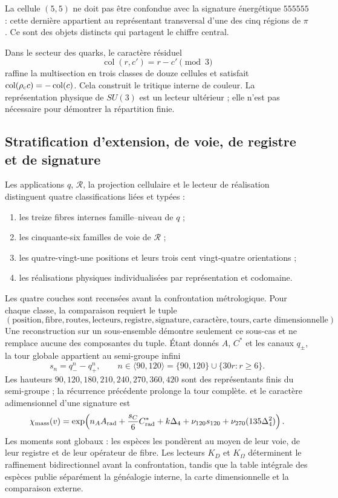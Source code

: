 La cellule \((5,5)\) ne doit pas être confondue avec la signature énergétique
\(555555\) : cette dernière appartient au représentant transversal d'une des
cinq régions de \(\pi\). Ce sont des objets distincts qui partagent le chiffre
central.

Dans le secteur des quarks, le caractère résiduel
\[
 \operatorname{col}(r,c')=r-c'\pmod3
\]
raffine la multisection en trois classes de douze cellules et satisfait
\(\operatorname{col}(\rho_{\rm c} c)=-\operatorname{col}(c)\). Cela construit le
tritique interne de couleur. La représentation physique de \(SU(3)\) est un
lecteur ultérieur ; elle n'est pas nécessaire pour démontrer la répartition finie.

\subsection{Stratification d'extension, de voie, de registre et de signature}

Les applications \(q\), \(\mathcal R\), la projection cellulaire et le lecteur de
réalisation distinguent quatre classifications liées et typées :
\begin{enumerate}[label=(\roman*)]
 \item les treize fibres internes famille--niveau de \(q\) ;
 \item les cinquante-six familles de voie de \(\mathcal R\) ;
 \item les quatre-vingt-une positions et leurs trois cent vingt-quatre
       orientations ;
 \item les réalisations physiques individualisées par représentation et codomaine.
\end{enumerate}
Les quatre couches sont recensées avant la confrontation métrologique. Pour chaque classe,
la comparaison requiert le tuple
\[
(\text{position},\text{fibre},\text{routes},\text{lecteurs},
\text{registre},\text{signature},\text{caractère},\text{tours},
\text{carte dimensionnelle}).
\]
Une reconstruction sur un sous-ensemble démontre seulement ce sous-cas et ne
remplace aucune des composantes du tuple.
Étant donnés \(A\), \(C^*\) et les canaux \(q_\pm\), la tour globale appartient au
semi-groupe infini
\[
 s_n=q_-^n-q_+^n,
 \qquad
 n\in\langle90,120\rangle
 =\{90,120\}\cup\{30r:r\geq6\}.
\]
Les hauteurs \(90,120,180,210,240,270,360,420\) sont des représentants finis du
semi-groupe ; la récurrence précédente prolonge la tour complète.
et le caractère adimensionnel d'une signature est
\[
 \chi_{\rm mass}(v)=\exp\!\left(
 n_AA_{\rm rad}+\frac{s_C}{6}C^*_{\rm rad}
 +k\Delta_4+\nu_{120}s_{120}+\nu_{270}(135\Delta_4^2)
 \right).
\]
Les moments sont globaux : les espèces les pondèrent au moyen de leur voie, de leur
registre et de leur opérateur de fibre. Les lecteurs \(K_D\) et \(K_\Omega\)
déterminent le raffinement bidirectionnel avant la confrontation, tandis que la
table intégrale des espèces publie séparément la généalogie interne, la
carte dimensionnelle et la comparaison externe.

